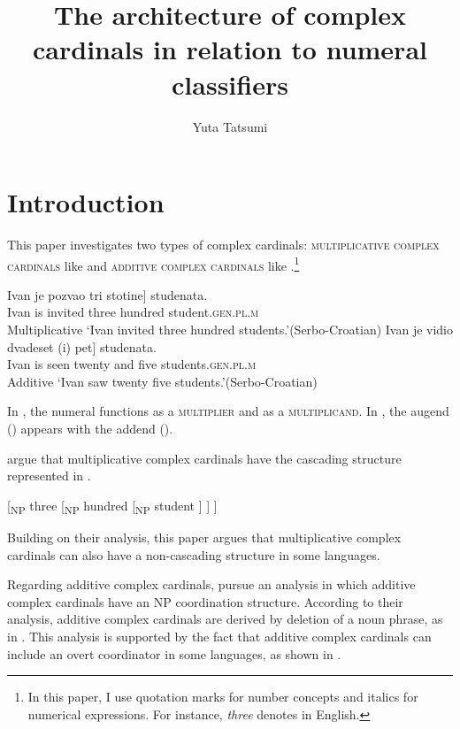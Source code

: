 \documentclass[output=paper]{langscibook}
\author{Yuta Tatsumi\affiliation{University of Connecticut}}
\title{The architecture of complex cardinals in relation to numeral classifiers}
\begin{document}
\maketitle


\section{Introduction}\label{tat:sec:intro}
This paper investigates two types of complex cardinals: \textsc{multiplicative complex cardinals} like  and \textsc{additive complex cardinals} like .\footnote{In this paper, I use quotation marks for number concepts and italics for numerical expressions. For instance, \textit{three} denotes  in English.}%

\ea
\ea\label{tat:ex:ex1a}
\gll Ivan je pozvao \minsp{[} tri stotine] studenata.\\
     Ivan is invited {} three hundred student.\textsc{gen.pl.m}\\\hfill Multiplicative
\glt `Ivan invited three hundred students.'\hfill (Serbo-Croatian)
\ex\label{tat:ex:ex1b}
 \gll Ivan je vidio \minsp{[} dvadeset (i) pet] studenata.\\
      Ivan is seen {} twenty and five students.\textsc{gen.pl.m}\\\hfill Additive
 \glt `Ivan saw twenty five students.'\hfill (Serbo-Croatian)
 \z
\z

\noindent In , the numeral  functions as a \textsc{multiplier} and  as a \textsc{multiplicand}. In , the augend () appears with the addend ().

\citet{IoninMatushansky2018} argue that multiplicative complex cardinals have the cascading structure represented in . 

\ea\label{tat:ex:cas}
{[}\textsubscript{NP} three [\textsubscript{NP} hundred [\textsubscript{NP} student ] ] ]\hfill \citep{IoninMatushansky2018}
\z

\noindent Building on their analysis, this paper argues that multiplicative complex cardinals can also have a non-cascading structure in some languages. 

Regarding additive complex cardinals, \citeauthor{IoninMatushansky2018} pursue an analysis in which additive complex cardinals have an NP coordination structure. According to their analysis, additive complex cardinals are derived by deletion of a noun phrase, as in . This analysis is supported by the fact that additive complex cardinals can include an overt coordinator in some languages, as shown in . 
\end{document}
